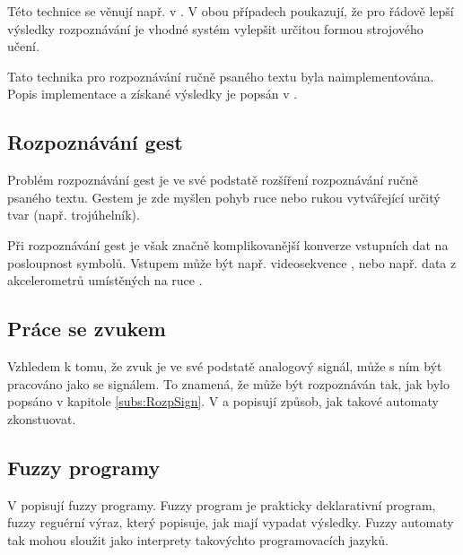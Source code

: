 \documentclass[a4paper,10pt]{article}
\begin{document}
Této technice se věnují např. v \cite{AstGariGonVillFar-ApprStrMatUsiDefFuzzAutLearExpr} \cite{WeeFu-FormFuzAutAppModLeaSys}. V obou případech poukazují, že pro řádově lepší výsledky rozpoznávání je vhodné systém vylepšit určitou formou strojového učení.

Tato technika pro rozpoznávání ručně psaného textu byla naimplementována. Popis implementace a získané výsledky je popsán v .

\subsection{Rozpoznávání gest}
Problém rozpoznávání gest je ve své podstatě rozšíření rozpoznávání ručně psaného textu. Gestem je zde myšlen pohyb ruce nebo rukou vytvářející určitý tvar (např. trojúhelník).

Při rozpoznávání gest je však značně komplikovanější konverze vstupních dat na posloupnost symbolů. Vstupem může být např. videosekvence  \cite{Tho-FinFuzzAutRegFuzLangPatRec}, nebo např. data z akcelerometrů umístěných na ruce \cite{BaiTri-PattRecUsiTemFuzzAut}.

\subsection{Práce se zvukem}
Vzhledem k tomu, že zvuk je ve své podstatě analogový signál, může s ním být pracováno jako se signálem. To znamená, že může být rozpoznáván tak, jak bylo popsáno v kapitole \ref{subs:RozpSign}. V \cite{ForBel-GenMusAccUsFinStaTra} a \cite{OliWag-ComMusNeuNetProFiStMa} popisují způsob, jak takové automaty zkonstuovat. 



\subsection{Fuzzy programy}
V \cite{Cha-ExeFuzProUsFiStaMa} popisují fuzzy programy. Fuzzy program je prakticky deklarativní program, fuzzy reguérní výraz, který popisuje, jak mají vypadat výsledky. Fuzzy automaty tak mohou sloužit jako interprety takovýchto programovacích jazyků. 
\end{document}
